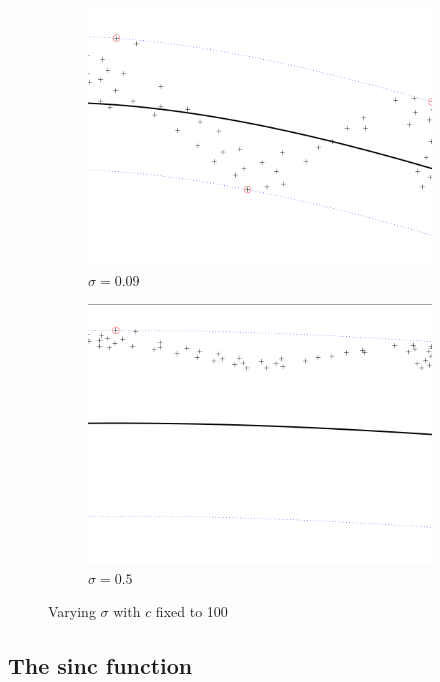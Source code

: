 \documentclass[a4paper, 11pt, one column]{article}
\begin{document}
\begin{figure}[]
\begin{subfigure}{0.33\linewidth}
            \includegraphics[width=\linewidth]{images/rbf_bound_100_e_0.09.png}
            \caption{$\sigma = 0.09$}
        \end{subfigure}\hfil
        \begin{subfigure}{0.33\linewidth}
            \includegraphics[width=\linewidth]{images/rbf_bound_100_e_0.5.png}
            \caption{$\sigma = 0.5$}
        \end{subfigure}\hfil
        \caption{Varying $\sigma$ with $c$ fixed to 100}
        \label{fig:decreasinge}
\end{figure}

\subsection{The sinc function}
\end{document}
